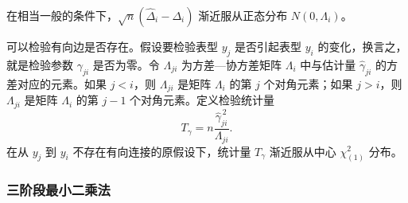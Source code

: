 在相当一般的条件下，$\sqrt n(\widehat\Delta_i-\Delta_i)$ 渐近服从正态分布 $N(0,\Lambda_i)$。

可以检验有向边是否存在。假设要检验表型 $y_j$ 是否引起表型 $y_i$ 的变化，换言之，就是检验参数 $\gamma_{ji}$ 是否为零。令 $\Lambda_{ji}$ 为方差—协方差矩阵 $\Lambda_i$ 中与估计量 $\widehat\gamma_{ji}$ 的方差对应的元素。如果 $j<i$，则 $\Lambda_{ji}$ 是矩阵 $\Lambda_i$ 的第 $j$ 个对角元素；如果 $j>i$，则 $\Lambda_{ji}$ 是矩阵 $\Lambda_i$ 的第 $j-1$ 个对角元素。定义检验统计量
\begin{equation}
 T_\gamma=n\frac{\widehat\gamma_{ji}^{\,2}}{\Lambda_{ji}}.
 \tag{1.65}
\end{equation}
在从 $y_j$ 到 $y_i$ 不存在有向连接的原假设下，统计量 $T_\gamma$ 渐近服从中心 $\chi^2_{(1)}$ 分布。

\subsubsection{三阶段最小二乘法}

